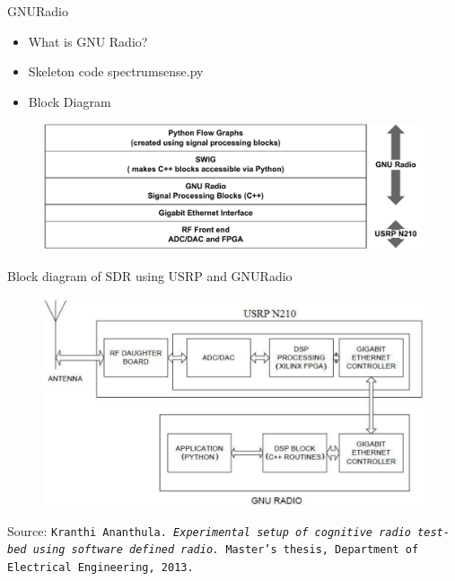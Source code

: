\documentclass{beamer}
\begin{document}
  \begin{frame}{GNURadio}
    \begin{minipage}[t][0.8\textheight][t]{\textwidth}
      \begin{itemize}
	  \item What is GNU Radio?
	  \item Skeleton code spectrumsense.py
	  \item Block Diagram
      \end{itemize}
      \begin{figure}
	\centering
	\includegraphics[width=\linewidth]{img/gnuradio_architecture}
      \end{figure}
   \end{minipage}
  \end{frame}

  \begin{frame}{Block diagram of SDR using USRP and GNURadio}
    \begin{minipage}[t][0.8\textheight][t]{\textwidth}
      \begin{figure}
	\centering
	\includegraphics[width=\linewidth]{img/usrpGNURadioBlock}
      \end{figure}
      \vfill
      \tiny{Source: \texttt{Kranthi Ananthula. \emph{Experimental setup of cognitive radio test-bed using software
defined radio.} Master's thesis, Department of Electrical Engineering, 2013.}}
   \end{minipage}
  \end{frame}
\end{document}
